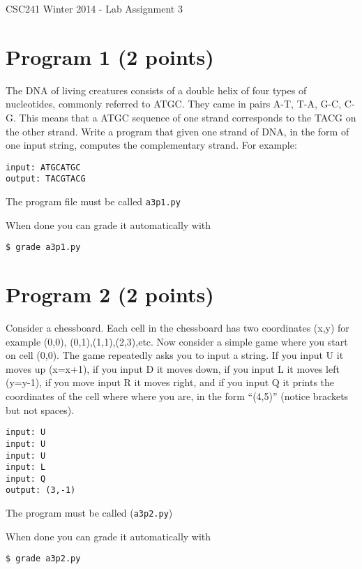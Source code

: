\documentclass[12pt]{article}
\begin{document}
{\Large CSC241 Winter 2014 - Lab Assignment 3}

\section{Program 1 (2 points)}

\noindent
The DNA of living creatures consists of a double helix of four types of nucleotides,               
commonly referred to ATGC. They came in pairs A-T, T-A, G-C, C-G.                                  
This means that a ATGC sequence of one strand corresponds to the TACG on the other strand.         
Write a program that given one strand of DNA, in the form of one input string,                     
computes the complementary strand. For example:
\begin{verbatim}
input: ATGCATGC
output: TACGTACG
\end{verbatim}
The program file must be called {\tt a3p1.py}

\noindent When done you can grade it automatically with
\begin{verbatim}
$ grade a3p1.py
\end{verbatim}

\section{Program 2 (2 points)}

\noindent 
Consider a chessboard. Each cell in the chessboard has two coordinates (x,y) for example (0,0),    
(0,1),(1,1),(2,3),etc. Now consider a simple game where you start on cell (0,0). The game          
repeatedly asks you to input a string. If you input U it moves up (x=x+1),                         
if you input D it moves down, if you input L it moves left (y=y-1),                                
if you move input R it moves right, and if you input Q it prints the coordinates                   
of the cell where where you are, in the form ``(4,5)'' (notice brackets but not spaces).             
\begin{verbatim}
input: U
input: U
input: U
input: L
input: Q
output: (3,-1)
\end{verbatim}
    
The program must be called ({\tt a3p2.py}) 

\noindent When done you can grade it automatically with
\begin{verbatim}
$ grade a3p2.py
\end{verbatim}
\end{document}
